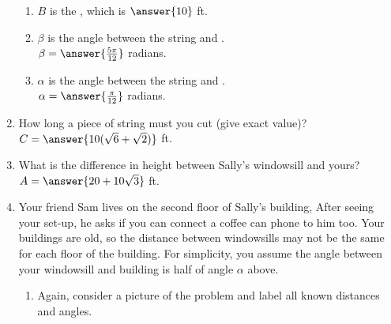 \documentclass{ximera}
\begin{document}
\begin{exercise}
\begin{enumerate}
\begin{enumerate}
\item $B$ is the , which is $\answer{10}$ ft.

\item $\beta$ is the angle between the string and . \smallskip\\
$\beta = \answer{\frac{5\pi}{12}}$ radians.

\item $\alpha$ is the angle between the string and . \smallskip\\
$\alpha = \answer{\frac{\pi}{12}}$ radians.
\end{enumerate}

\item How long a piece of string must you cut (give exact value)? $C = \answer{10(\sqrt{6}+\sqrt{2})}$ ft.

\item What is the difference in height between Sally's windowsill and yours? $A = \answer{20+10\sqrt{3}}$ ft.

\item \begin{exercise}
Your friend Sam lives on the second floor of Sally's building, After seeing your set-up, he asks if you can connect a coffee can phone to him too. 
Your buildings are old, so the distance between windowsills may not be the same for each floor of the building. For simplicity, you assume the angle between your windowsill and building is half of angle $\alpha$ above.
%
\begin{enumerate}
\item Again, consider a picture of the problem and label all known distances and angles.
\begin{image}[2in]
		\end{image}


\end{enumerate}
\end{exercise}
\end{enumerate}
\end{exercise}
\end{document}
